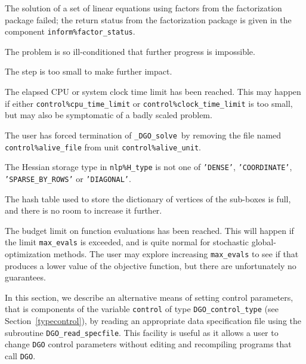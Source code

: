 \documentclass{galahad}
\newcommand{\packagename}{DGO}
\newcommand{\fullpackagename}{\libraryname\_\packagename}
\newcommand{\solver}{{\tt \fullpackagename\_solve}}
\begin{document}
\begin{description}
 The solution of a set of linear equations
 using factors from the factorization package failed;
 the return status from the factorization
    package is given in the component {\tt inform\%fac\-t\-or\_status}.

 The problem is so ill-conditioned that
  further progress is impossible.

 The step is too small to make further impact.

 The elapsed CPU or system clock time limit has been
    reached. This may happen if either {\tt control\%cpu\_time\_limit} or
    {\tt control\%clock\_time\_limit} is too small, but may also be symptomatic
    of a badly scaled problem.

 The user has forced termination of \solver\
     by removing the file named {\tt control\%a\-live\_file} from
     unit {\tt control\%alive\_unit}.

 The Hessian storage type in
    {\tt nlp\%H\_type} is not one of 
    {\tt 'DENSE'}, {\tt 'COORDINATE'}, {\tt 'SPARSE\_BY\_ROWS'}
    or {\tt 'DIAGONAL'}.

 The hash table used to store the dictionary
     of vertices of the sub-boxes is full, and there is no room to increase
     it further.

 The budget limit on function evaluations has
    been reached.  This will happen if the limit {\tt max\_evals} is
    exceeded, and is quite normal for stochastic global-optimization methods.
    The user may explore increasing {\tt max\_evals} to see if that 
    produces a lower value of the objective function, but there are 
    unfortunately no guarantees.

\end{description}


\galfeatures
\noindent In this section, we describe an alternative means of setting
control parameters, that is components of the variable {\tt control} of type
{\tt \packagename\_control\_type}
(see Section~\ref{typecontrol}),
by reading an appropriate data specification file using the
subroutine {\tt \packagename\_read\_specfile}. This facility
is useful as it allows a user to change  {\tt \packagename} control parameters
without editing and recompiling programs that call {\tt \packagename}.
\end{document}
